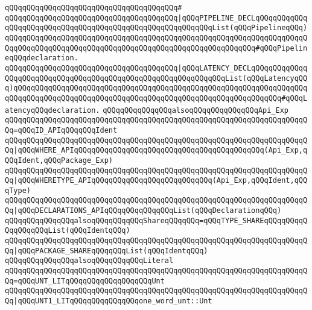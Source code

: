 \verb|qQQqqQQqqQQqqQQqqQQqqQQqqQQqqQQqqQQqqQQq#|\newline
\verb|qQQqqQQqqQQqqQQqqQQqqQQqqQQqqQQqqQQqqQQq|\verb#|qQQqPIPELINE_DECLqQQqqQQqqQQqqQQqqQQqqQQqqQQqqQQqqQQqqQQqqQQqqQQqqQQqqQQqqQQqList(qQQqPipelineqQQq)qQQqqQQqqQQqqQQqqQQqqQQqqQQqqQQqqQQqqQQqqQQqqQQqqQQqqQQqqQQqqQQqqQQqqQQqqQQqqQQqqQQqqQQqqQQqqQQqqQQqqQQqqQQqqQQqqQQqqQQqqQQqqQQq#\verb|#qQQqPipelineqQQqdeclaration.|\newline
\verb|qQQqqQQqqQQqqQQqqQQqqQQqqQQqqQQqqQQqqQQq|\verb#|qQQqLATENCY_DECLqQQqqQQqqQQqqQQqqQQqqQQqqQQqqQQqqQQqqQQqqQQqqQQqqQQqqQQqqQQqqQQqList(qQQqLatencyqQQq)qQQqqQQqqQQqqQQqqQQqqQQqqQQqqQQqqQQqqQQqqQQqqQQqqQQqqQQqqQQqqQQqqQQqqQQqqQQqqQQqqQQqqQQqqQQqqQQqqQQqqQQqqQQqqQQqqQQqqQQqqQQqqQQqqQQq#\verb|#qQQqLatencyqQQqdeclaration.|\newline
\newline
\verb|qQQqqQQqqQQqqQQqalsoqQQqqQQqqQQqqQQqApi_Exp|\newline
\verb|qQQqqQQqqQQqqQQqqQQqqQQqqQQqqQQqqQQqqQQqqQQqqQQqqQQqqQQqqQQqqQQqqQQqqQQq=qQQqID_APIqQQqqQQqIdent|\newline
\verb|qQQqqQQqqQQqqQQqqQQqqQQqqQQqqQQqqQQqqQQqqQQqqQQqqQQqqQQqqQQqqQQqqQQqqQQq|\verb#|qQQqWHERE_APIqQQqqQQqqQQqqQQqqQQqqQQqqQQqqQQqqQQqqQQqqQQq(Api_Exp,qQQqIdent,qQQqPackage_Exp)#\newline
\verb|qQQqqQQqqQQqqQQqqQQqqQQqqQQqqQQqqQQqqQQqqQQqqQQqqQQqqQQqqQQqqQQqqQQqqQQq|\verb#|qQQqWHERETYPE_APIqQQqqQQqqQQqqQQqqQQqqQQqqQQq(Api_Exp,qQQqIdent,qQQqType)#\newline
\verb|qQQqqQQqqQQqqQQqqQQqqQQqqQQqqQQqqQQqqQQqqQQqqQQqqQQqqQQqqQQqqQQqqQQqqQQq|\verb#|qQQqDECLARATIONS_APIqQQqqQQqqQQqqQQqList(qQQqDeclarationqQQq)#\newline
\newline
\verb|qQQqqQQqqQQqqQQqalsoqQQqqQQqqQQqShareqQQqqQQq=qQQqTYPE_SHAREqQQqqQQqqQQqqQQqqQQqList(qQQqIdentqQQq)|\newline
\verb|qQQqqQQqqQQqqQQqqQQqqQQqqQQqqQQqqQQqqQQqqQQqqQQqqQQqqQQqqQQqqQQqqQQqqQQq|\verb#|qQQqPACKAGE_SHAREqQQqqQQqList(qQQqIdentqQQq)#\newline
\newline
\verb|qQQqqQQqqQQqqQQqalsoqQQqqQQqqQQqLiteral|\newline
\verb|qQQqqQQqqQQqqQQqqQQqqQQqqQQqqQQqqQQqqQQqqQQqqQQqqQQqqQQqqQQqqQQqqQQqqQQq=qQQqUNT_LITqQQqqQQqqQQqqQQqqQQqUnt|\newline
\verb|qQQqqQQqqQQqqQQqqQQqqQQqqQQqqQQqqQQqqQQqqQQqqQQqqQQqqQQqqQQqqQQqqQQqqQQq|\verb#|qQQqUNT1_LITqQQqqQQqqQQqqQQqone_word_unt::Unt#\newline
